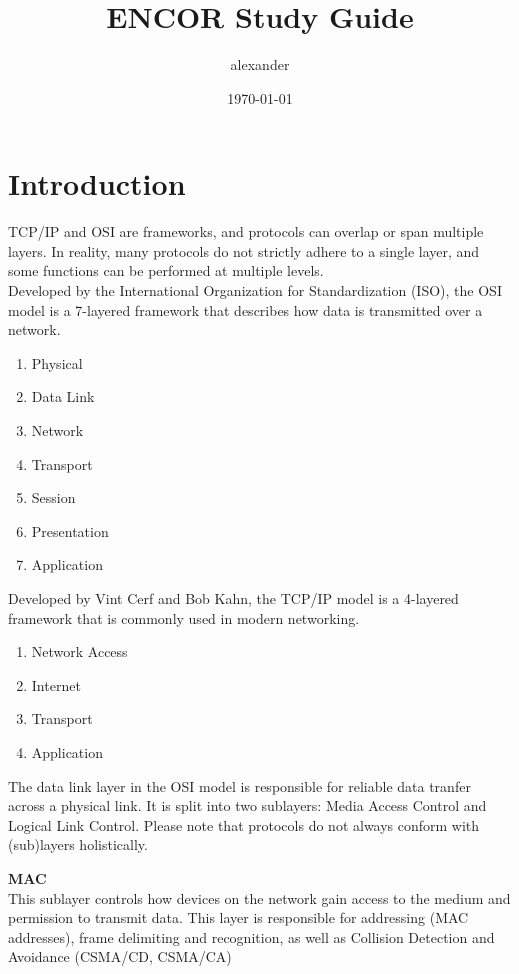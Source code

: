 \documentclass[parindent=0pt]{article}
\title{ENCOR Study Guide}
\author{alexander}
\date{\today}
\begin{document}
\maketitle

\section*{Introduction}

TCP/IP and OSI are frameworks, and protocols can overlap or span multiple layers. In reality, many protocols do not strictly adhere to a single layer, and some functions can be performed at multiple levels.\\

Developed by the International Organization for Standardization (ISO), the OSI model is a 
7-layered framework that describes how data is transmitted over a network.	
	\begin{enumerate}
		\item Physical
		\item Data Link
		\item Network
		\item Transport
		\item Session
		\item Presentation
		\item Application
	\end{enumerate}

Developed by Vint Cerf and Bob Kahn, the TCP/IP model is a 4-layered framework that is commonly 
used in modern networking.
	\begin{enumerate}
		\item Network Access
		\item Internet
		\item Transport
		\item Application
	\end{enumerate}

The data link layer in the OSI model is responsible for reliable data tranfer across a physical link. It is split into two sublayers: Media Access Control and Logical Link Control. Please note that protocols do not always conform with (sub)layers holistically. 

\textbf{MAC}\\
This sublayer controls how devices on the network gain access to the medium and permission to transmit data. This layer is responsible for addressing (MAC addresses), frame delimiting and recognition, as well as Collision Detection and Avoidance (CSMA/CD, CSMA/CA)\\
\end{document}
